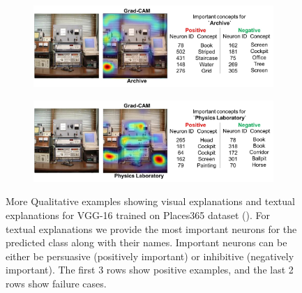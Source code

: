 \begin{figure}[h]
\begin{center}
\begin{subfigure}[t]{\columnwidth}
\vspace{10pt}
\end{subfigure}
\begin{subfigure}[t]{\columnwidth}
\includegraphics[scale=0.135]{figures/5_neg.jpg}\caption{}
\vspace{10pt}
\end{subfigure}
\begin{subfigure}[t]{\columnwidth}
\includegraphics[scale=0.135]{figures/6_neg.jpg}\caption{}
\vspace{10pt}
\end{subfigure}
  \caption{More Qualitative examples showing visual explanations and textual explanations for VGG-16 trained on Places365 dataset (\cite{zhou2017places}). For textual explanations we provide the most important neurons for the predicted class along with their names. Important neurons can be either be persuasive (positively important) or inhibitive (negatively important). 
  The first 3 rows show positive examples, and the last 2 rows show failure cases.}
  \label{fig:sup_text_explanations}
\end{center}
\end{figure}

